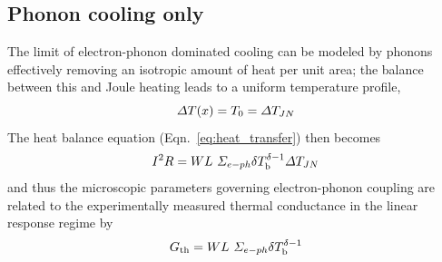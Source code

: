 \subsection{Phonon cooling only}
The limit of electron-phonon dominated cooling can be modeled by phonons effectively removing an isotropic amount of heat per unit area; the balance between this and Joule heating leads to a uniform temperature profile, 
\begin{equation}
\Delta T(x) = T_0 = \Delta T_{JN}
\end{equation}
The heat balance equation (Eqn.~\ref{eq:heat_transfer}) then becomes
\begin{equation}
I^2R = WL~\Sigma_{e-ph}\delta T_\mathrm{b}^{\delta-1}\Delta T_{JN}
\end{equation}
and thus the microscopic parameters governing electron-phonon coupling are related to the experimentally measured thermal conductance in the linear response regime by
\begin{equation}
G_{\mathrm{th}} = WL~\Sigma_{e-ph}\delta T_\mathrm{b}^{\delta-1}
\end{equation}

